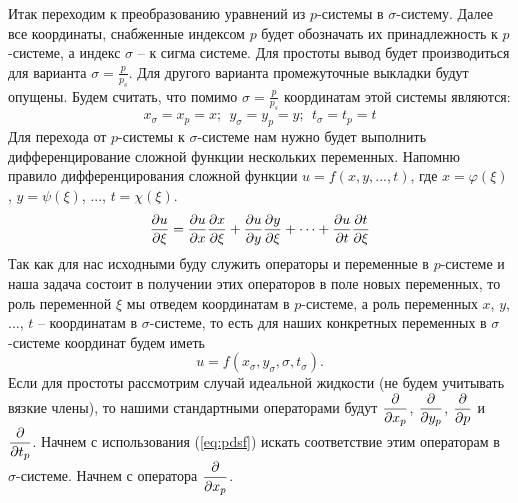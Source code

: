 Итак переходим к преобразованию уравнений из $p$-системы в $\sigma$-систему. Далее все координаты, снабженные индексом $p$ будет обозначать их принадлежность к $p$-системе, а индекс $\sigma$ -- к сигма системе. Для простоты вывод будет производиться для варианта $\sigma=\frac{p}{p_s}$.  Для другого варианта промежуточные выкладки будут опущены. Будем считать, что помимо $\sigma=\frac{p}{p_s}$ координатам этой системы являются: 
\begin{equation}
    x_{\sigma}=x_p=x; \:\:y_{\sigma}=y_p=y; \:\:t_{\sigma}=t_p=t
\end{equation}
Для перехода от $p$-системы к $\sigma$-системе нам нужно будет выполнить дифференцирование сложной функции нескольких переменных. Напомню правило дифференцирования сложной функции $u=f(x,y,...,t)$, где $x=\varphi(\xi)$, $y=\psi(\xi)$, ..., $t=\chi(\xi)$.
\begin{equation}
\label{eq:pdsf}
    \displaystyle\frac{\partial u}{\partial \xi}=\displaystyle\frac{\partial u}{\partial x}\displaystyle\frac{\partial x}{\partial \xi}+\displaystyle\frac{\partial u}{\partial y}\displaystyle\frac{\partial y}{\partial \xi}+\cdots+\displaystyle\frac{\partial u}{\partial t}\displaystyle\frac{\partial t}{\partial \xi}
\end{equation}
Так как для нас исходными буду служить операторы и переменные в $p$-системе и наша задача состоит в получении этих операторов в поле новых переменных, то роль переменной $\xi$ мы отведем координатам в $p$-системе, а роль переменных $x$, $y$, ..., $t$ -- координатам в $\sigma$-системе, то есть для наших конкретных переменных в $\sigma$-системе координат будем иметь
\begin{equation*}
    u=f(x_{\sigma},y_{\sigma},\sigma,t_{\sigma}).
\end{equation*}
Если для простоты рассмотрим случай идеальной жидкости (не будем учитывать вязкие члены), то нашими стандартными операторами будут $\displaystyle\frac{\partial }{\partial x_p}$, $\displaystyle\frac{\partial }{\partial y_p}$, $\displaystyle\frac{\partial }{\partial p}$ и $\displaystyle\frac{\partial }{\partial t_p}$. Начнем с использования (\ref{eq:pdsf}) искать соответствие этим операторам в $\sigma$-системе. Начнем с оператора $\displaystyle\frac{\partial }{\partial x_p}$.

